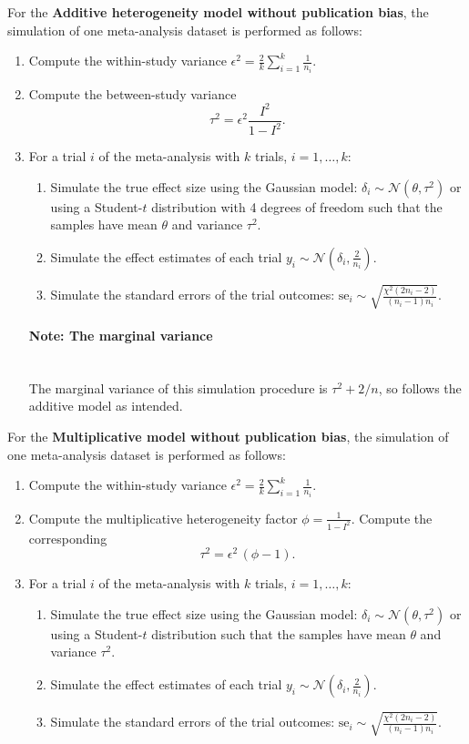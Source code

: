 \documentclass[letterpaper, 9pt]{article}
\newcommand{\N}{\mathcal{N}}
\begin{document}
For the \textbf{Additive heterogeneity model without publication bias}, the simulation of one meta-analysis dataset is performed as follows:
\begin{enumerate}
\item Compute the within-study variance $\epsilon^2 = \frac{2}{k} \sum\limits_{i=1}^k \frac{1}{n_i}$.
\item Compute the between-study variance
  \begin{equation}\label{eq:eq1}
    \tau^2 = \epsilon^2 \frac{I^2}{1-I^2}.
\end{equation}
\item For a trial $i$ of the meta-analysis with $k$ trials, $i = 1, \dots, k$:
  \begin{enumerate}
  \item Simulate the true effect size using the Gaussian model: $\delta_i \sim \N(\theta, \tau^2)$ or using a Student-$t$ distribution with 4 degrees of freedom such that the samples have mean $\theta$ and variance $\tau^2$.
  \item Simulate the effect estimates of each trial $y_i \sim \N(\delta_i, \frac{2}{n_i})$.
  \item Simulate the standard errors of the trial outcomes: $\text{se}_i \sim \sqrt{\frac{\chi^2(2n_i-2)}{(n_i-1)n_i}}$.
  \end{enumerate}

\paragraph{Note: The marginal variance}\mbox{}\\
The marginal variance of this simulation procedure is
$\tau^2 + 2/n$, so follows the additive model as intended.
\end{enumerate}
For the \textbf{Multiplicative model without publication bias}, the simulation of one meta-analysis dataset is performed as follows:
\begin{enumerate}
\item Compute the within-study variance $\epsilon^2 = \frac{2}{k} \sum\limits_{i=1}^k \frac{1}{n_i}$.
  \item Compute the multiplicative heterogeneity factor $\phi = \frac{1}{1-I^2}$. Compute the corresponding
  \begin{equation}\label{eq:eq2}
    \tau^2 = \epsilon^2 \, (\phi-1) .
  \end{equation}
\item For a trial $i$ of the meta-analysis with $k$ trials, $i = 1, \dots, k$:
  \begin{enumerate}
  \item Simulate the true effect size using the Gaussian model: $\delta_i \sim \N(\theta, \tau^2)$ or using a Student-$t$ distribution such that the samples have mean $\theta$ and variance $\tau^2$.
  \item Simulate the effect estimates of each trial $y_i \sim \N(\delta_i, \frac{2}{n_i})$.
  \item Simulate the standard errors of the trial outcomes: $\text{se}_i \sim \sqrt{\frac{\chi^2(2n_i-2)}{(n_i-1)n_i}}$.
  \end{enumerate}
  \end{enumerate}
\end{document}

